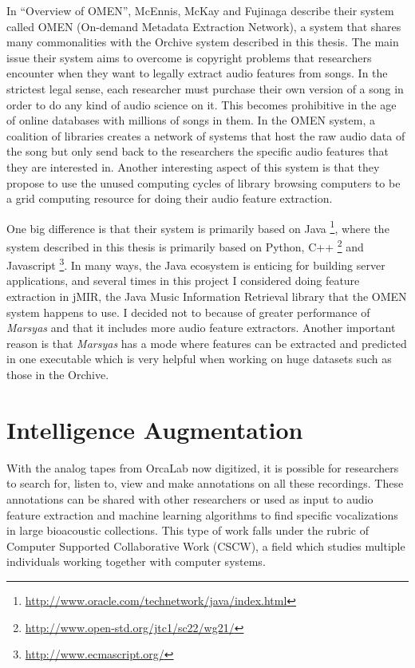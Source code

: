 In ``Overview of OMEN''\cite{mcennis2006omen}, McEnnis, McKay and
Fujinaga describe their system called OMEN (On-demand Metadata
Extraction Network), a system that shares many commonalities with the
Orchive system described in this thesis.  The main issue their
system aims to overcome is copyright problems that researchers
encounter when they want to legally extract audio features from songs.
In the strictest legal sense, each researcher must purchase their own
version of a song in order to do any kind of audio science on it.
This becomes prohibitive in the age of online databases with millions
of songs in them.  In the OMEN system, a coalition of libraries
creates a network of systems that host the raw audio data of the song
but only send back to the researchers the specific audio features that
they are interested in.  Another interesting aspect of this system is
that they propose to use the unused computing cycles of library
browsing computers to be a grid computing resource for doing their
audio feature extraction.

One big difference is that their system is primarily based on
Java \footnote{\url{http://www.oracle.com/technetwork/java/index.html}},
where the system described in this thesis is primarily based on
Python, C++ \footnote{\url{http://www.open-std.org/jtc1/sc22/wg21/}}
and Javascript \footnote{\url{http://www.ecmascript.org/}}.  In many
ways, the Java ecosystem is enticing for building server applications,
and several times in this project I considered doing feature
extraction in jMIR, the Java Music Information Retrieval library that
the OMEN system happens to use.  I decided not to because of greater
performance of \textit{Marsyas} and that it includes more audio feature
extractors.  Another important reason is that \textit{Marsyas} has a mode where
features can be extracted and predicted in one executable which is
very helpful when working on huge datasets such as those in the
Orchive.

\section{Intelligence Augmentation}
\label{section:relatedWork:intelligenceAugmentation}

With the analog tapes from OrcaLab now digitized, it is possible for
researchers to search for, listen to, view and make annotations on all
these \totalNumberOfOrchiveRecordings recordings.  These annotations
can be shared with other researchers or used as input to audio feature
extraction and machine learning algorithms to find specific
vocalizations in large bioacoustic collections.  This type of work
falls under the rubric of Computer Supported Collaborative Work
\cite{bannon1991cscw} (CSCW), a field which studies multiple
individuals working together with computer systems.

